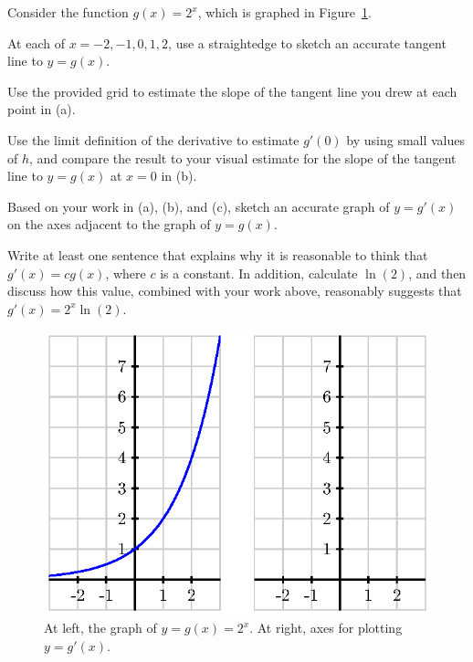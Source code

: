 \begin{pa} \label{PA:2.2}
Consider the function $g(x) = 2^x$, which is graphed in Figure~\ref{F:2.2.PA1}.
\ba
	\item At each of $x = -2, -1, 0, 1, 2$, use a straightedge to sketch an accurate tangent line to $y = g(x)$.
	\item Use the provided grid to estimate the slope of the tangent line you drew at each point in (a).
	\item Use the limit definition of the derivative to estimate $g'(0)$ by using small values of $h$, and compare the result to your visual estimate for the slope of the tangent line to $y = g(x)$ at $x = 0$ in (b).
	\item Based on your work in (a), (b), and (c), sketch an accurate graph of $y = g'(x)$ on the axes adjacent to the graph of $y = g(x)$.
	\item Write at least one sentence that explains why it is reasonable to think that $g'(x) = cg(x)$, where $c$ is a constant.  In addition, calculate $\ln(2)$, and then discuss how this value, combined with your work above, reasonably suggests that $g'(x) = 2^x \ln(2)$.
\ea
\begin{figure}[h]
\begin{center}
\includegraphics{figures/2_2_PA1a.eps}
\caption{At left, the graph of $y = g(x) = 2^x$. At right, axes for plotting $y = g'(x)$.} \label{F:2.2.PA1}
\end{center}
\end{figure}
\end{pa} \afterpa